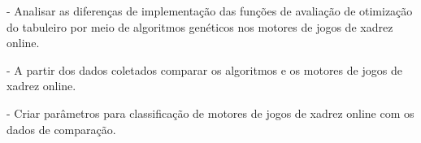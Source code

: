 - Analisar as diferenças de implementação das funções de avaliação de otimização do tabuleiro por meio de algoritmos genéticos nos motores de jogos de xadrez online.

- A partir dos dados coletados comparar os algoritmos e os motores de jogos de xadrez online.

- Criar parâmetros para classificação de motores de jogos de xadrez online com os dados de comparação.



